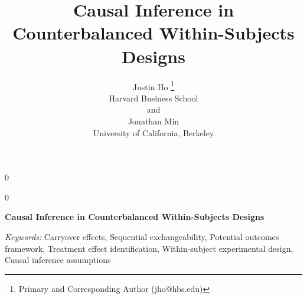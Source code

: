 \documentclass[12pt]{article}
\newcommand{\blind}{0}
\begin{document}
%

\def\spacingset#1{\renewcommand{\baselinestretch}%
{#1}\small\normalsize} \spacingset{1}



\blind
{
  \title{\bf Causal Inference in Counterbalanced Within-Subjects Designs}
  \author{Justin Ho
  \thanks{Primary and Corresponding Author (jho@hbs.edu)}\hspace{.2cm}\\
    Harvard Business School\\
    and \\
    Jonathan Min\\
    University of California, Berkeley}
  \maketitle
} \fi

\blind
{
  \bigskip
  \bigskip
  \bigskip
  \begin{center}
    {\LARGE\bf Causal Inference in Counterbalanced Within-Subjects Designs}
\end{center}
  \medskip
} \fi

\bigskip



\noindent%
{\it Keywords:}  Carryover effects, Sequential exchangeability, Potential outcomes framework, Treatment effect identification, Within-subject experimental design, Causal inference assumptions

\vfill

\newpage
\spacingset{1.45} %












\newpage


\end{document}
